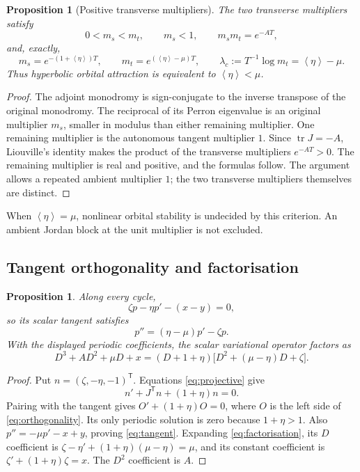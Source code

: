 \documentclass[11pt,a4paper]{article}
\numberwithin{equation}{section}
\newtheorem{proposition}[theorem]{Proposition}
\theoremstyle{remark}\newtheorem{remark}[theorem]{Remark}
\newcommand{\avg}[1]{\left\langle #1\right\rangle}
\DeclareMathOperator{\tr}{tr}
\begin{document}
\begin{proposition}[Positive transverse multipliers]\label{prop:multipliers}
The two transverse multipliers satisfy
\begin{equation}\label{eq:multipliers}
0<m_s<m_t,\qquad m_s<1,\qquad m_sm_t=e^{-AT},
\end{equation}
and, exactly,
\begin{equation}\label{eq:exponent}
m_s=e^{-(1+\avg\eta)T},\qquad
m_t=e^{(\avg\eta-\mu)T},\qquad
\lambda_c:=T^{-1}\log m_t=\avg\eta-\mu.
\end{equation}
Thus hyperbolic orbital attraction is equivalent to $\avg\eta<\mu$.
\end{proposition}
\begin{proof}
The adjoint monodromy is sign-conjugate to the inverse transpose of the original monodromy. The reciprocal of its Perron eigenvalue is an original multiplier $m_s$, smaller in modulus than either remaining multiplier. One remaining multiplier is the autonomous tangent multiplier $1$. Since $\tr J=-A$, Liouville's identity makes the product of the transverse multipliers $e^{-AT}>0$. The remaining multiplier is real and positive, and the formulas follow. The argument allows a repeated ambient multiplier $1$; the two transverse multipliers themselves are distinct.
\end{proof}
When $\avg\eta=\mu$, nonlinear orbital stability is undecided by this criterion. An ambient Jordan block at the unit multiplier is not excluded.

\subsection{Tangent orthogonality and factorisation}
\begin{proposition}\label{prop:factor}
Along every cycle,
\begin{equation}\label{eq:orthogonality}
\zeta p-\eta p'-(x-y)=0,
\end{equation}
so its scalar tangent satisfies
\begin{equation}\label{eq:tangent}
p''=(\eta-\mu)p'-\zeta p.
\end{equation}
With the displayed periodic coefficients, the scalar variational operator factors as
\begin{equation}\label{eq:factorisation}
D^3+AD^2+\mu D+x=(D+1+\eta)\bigl[D^2+(\mu-\eta)D+\zeta\bigr].
\end{equation}
\end{proposition}
\begin{proof}
Put $n=(\zeta,-\eta,-1)^{\mathsf T}$. Equations \eqref{eq:projective} give
\[
n'+J^{\mathsf T}n+(1+\eta)n=0.
\]
Pairing with the tangent gives $O'+(1+\eta)O=0$, where $O$ is the left side of \eqref{eq:orthogonality}. Its only periodic solution is zero because $1+\eta>1$. Also $p''=-\mu p'-x+y$, proving \eqref{eq:tangent}. Expanding \eqref{eq:factorisation}, its $D$ coefficient is $\zeta-\eta'+(1+\eta)(\mu-\eta)=\mu$, and its constant coefficient is $\zeta'+(1+\eta)\zeta=x$. The $D^2$ coefficient is $A$.
\end{proof}
\end{document}
